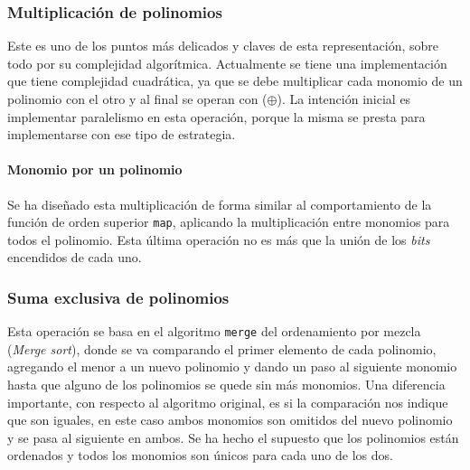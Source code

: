 \subsubsection{Multiplicación de polinomios}

Este es uno de los puntos más delicados y claves de esta representación, sobre todo por su complejidad algorítmica. Actualmente se tiene una implementación que tiene complejidad cuadrática, ya que se debe multiplicar cada monomio de un polinomio con el otro y al final se operan con ($\oplus$). La intención inicial es implementar paralelismo en esta operación, porque la misma se presta para implementarse con ese tipo de estrategia.

\paragraph{Monomio por un polinomio}

Se ha diseñado esta multiplicación de forma similar al comportamiento de la función de orden superior \texttt{map}, aplicando la multiplicación entre monomios para todos el polinomio. Esta última operación no es más que la unión de los \textit{bits} encendidos de cada uno.

\subsubsection{Suma exclusiva de polinomios}

Esta operación se basa en el algoritmo \texttt{merge} del ordenamiento por mezcla (\textit{Merge sort}), donde se va comparando el primer elemento de cada polinomio, agregando el menor a un nuevo polinomio y dando un paso al siguiente monomio hasta que alguno de los polinomios se quede sin más monomios. Una diferencia importante, con respecto al algoritmo original, es si la comparación nos indique que son iguales, en este caso ambos monomios son omitidos del nuevo polinomio y se pasa al siguiente en ambos. Se ha hecho el supuesto que los polinomios están ordenados y todos los monomios son únicos para cada uno de los dos.
